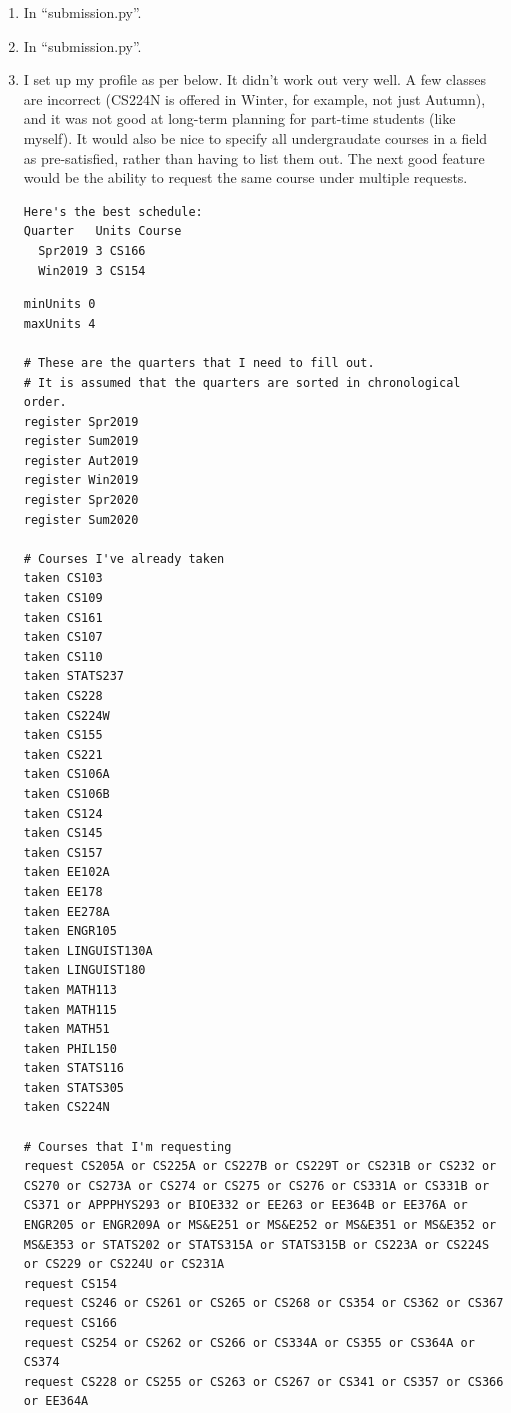 \documentclass[12pt]{article}
\begin{document}
\begin{enumerate}[label=(\alph*)]
\item In ``submission.py''.
\item In ``submission.py''.
\item I set up my profile as per below. It didn't work out very well. A few classes are incorrect (CS224N is offered in Winter, for example, not just Autumn), and it was not good at long-term planning for part-time students (like myself). It would also be nice to specify all undergraudate courses in a field as pre-satisfied, rather than having to list them out. The next good feature would be the ability to request the same course under multiple requests.

\begin{verbatim}
Here's the best schedule:
Quarter   Units Course
  Spr2019 3 CS166
  Win2019 3 CS154
\end{verbatim}

\begin{verbatim}
minUnits 0
maxUnits 4

# These are the quarters that I need to fill out.
# It is assumed that the quarters are sorted in chronological order.
register Spr2019
register Sum2019
register Aut2019
register Win2019
register Spr2020
register Sum2020

# Courses I've already taken
taken CS103
taken CS109
taken CS161
taken CS107
taken CS110
taken STATS237
taken CS228
taken CS224W
taken CS155
taken CS221
taken CS106A
taken CS106B
taken CS124
taken CS145
taken CS157
taken EE102A
taken EE178
taken EE278A
taken ENGR105
taken LINGUIST130A
taken LINGUIST180
taken MATH113
taken MATH115
taken MATH51
taken PHIL150
taken STATS116
taken STATS305
taken CS224N

# Courses that I'm requesting
request CS205A or CS225A or CS227B or CS229T or CS231B or CS232 or CS270 or CS273A or CS274 or CS275 or CS276 or CS331A or CS331B or CS371 or APPPHYS293 or BIOE332 or EE263 or EE364B or EE376A or ENGR205 or ENGR209A or MS&E251 or MS&E252 or MS&E351 or MS&E352 or MS&E353 or STATS202 or STATS315A or STATS315B or CS223A or CS224S or CS229 or CS224U or CS231A
request CS154
request CS246 or CS261 or CS265 or CS268 or CS354 or CS362 or CS367
request CS166
request CS254 or CS262 or CS266 or CS334A or CS355 or CS364A or CS374
request CS228 or CS255 or CS263 or CS267 or CS341 or CS357 or CS366 or EE364A


\end{verbatim}
\end{enumerate}
\end{document}
